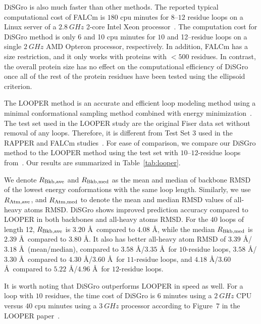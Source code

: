 {\sc DiSGro} is also much faster than other methods. The reported
typical computational cost of FALCm is $180$ cpu minutes for
$8$--$12$ residue loops on a Linux server of a $2.8\:GHz$ 2-core
Intel Xeon processor~\cite{ko2011}. The computation cost for {\sc
DiSGro} method is only $6$ and 10 cpu minutes for $10$ and
12--residue loops on a single $2\:GHz$ AMD Opteron processor,
respectively. In addition, FALCm has a size restriction, and it only
works with proteins with $<500$ residues. In contrast, the overall
protein size has no effect on the computational efficiency of {\sc
DiSGro} once all of the rest of the protein residues have been
tested using the ellipsoid criterion.

The LOOPER method is an accurate and efficient loop modeling method
using a minimal conformational sampling method combined with energy
minimization~\cite{spassov2008}. The test set used in the LOOPER
study are the original Fiser data set without removal of any loops.
Therefore, it is different from Test Set 3 used in the RAPPER and
FALCm studies~\cite{depristo2003,lee2010}. For ease of comparison,
we compare our {\sc DiSGro} method to the LOOPER method using the
test set with $10$--$12$-residue loops from~\cite{spassov2008}. Our
results are summarized in Table~\ref{tab:looper}.

We denote $R_{\rm Bkb,ave}$ and $R_{\rm Bkb,med}$ as the mean and
median of backbone RMSD of the lowest energy conformations with the
same loop length. Similarly, we use $R_{\rm Atm,ave}$, and $R_{\rm
Atm,med}$ to denote the mean and median RMSD values of all-heavy
atoms RMSD. {\sc DiSGro} shows improved prediction accuracy compared
to LOOPER in both backbones and all-heavy atoms RMSD. For the $40$
loops of length 12, $R_{\rm Bkb,ave}$ is $3.20$ \r{A}\ compared to
$4.08$ \r{A}, while the median $R_{\rm Bkb,med}$ is $2.39$ \r{A}\
compared to $3.80$ \r{A}. It also has better all-heavy atom RMSD of
$3.39$ \r{A}/$3.18$ \r{A}\ (mean/median), compared to $3.58$
\r{A}/$3.35$ \r{A}\ for $10$-residue loops, $3.58$ \r{A}/$3.30$
\r{A}\ compared to $4.30$ \r{A}/$3.60$ \r{A}\ for $11$-residue
loops, and $4.18$ \r{A}/$3.60$ \r{A}\ compared to $5.22$
\r{A}/$4.96$ \r{A}\ for $12$-residue loops.

It is worth noting that {\sc DiSGro} outperforms LOOPER in speed as
well. For a loop with $10$ residues, the time cost of {\sc DiSGro}
is $6$ minutes using a $2\:GHz$ CPU versus $40$ cpu minutes using a
$3\:GHz$ processor according to Figure~$7$ in the LOOPER
paper~\cite{spassov2008}.

